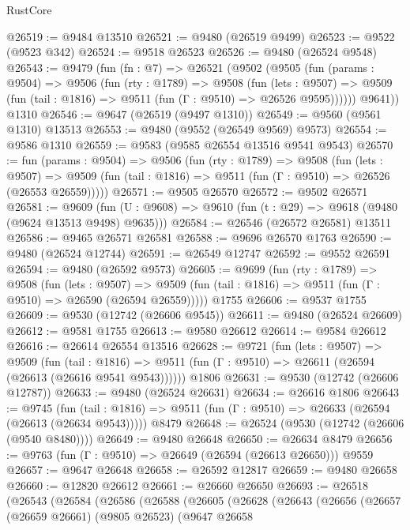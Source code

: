 \begin{lexlean}{RustCore}
\begin{coremodule}
@26519 := @9484 @13510
@26521 := @9480 (@26519 @9499)
@26523 := @9522 (@9523 @342)
@26524 := @9518 @26523
@26526 := @9480 (@26524 @9548)
@26543 := @9479
    (fun (fn : @7) =>
    @26521
      (@9502
        (@9505
          (fun (params : @9504) =>
          @9506
            (fun (rty : @1789) =>
            @9508
              (fun (lets : @9507) =>
              @9509 (fun (tail : @1816) => @9511 (fun (Γ : @9510) => @26526 @9595))))))
        @9641))
    @1310
@26546 := @9647 (@26519 (@9497 @1310))
@26549 := @9560 (@9561 @1310) @13513
@26553 := @9480 (@9552 (@26549 @9569) @9573)
@26554 := @9586 @1310
@26559 := @9583 (@9585 @26554 @13516 @9541 @9543)
@26570 := fun (params : @9504) =>
  @9506
    (fun (rty : @1789) =>
    @9508
      (fun (lets : @9507) =>
      @9509 (fun (tail : @1816) => @9511 (fun (Γ : @9510) => @26526 (@26553 @26559)))))
@26571 := @9505 @26570
@26572 := @9502 @26571
@26581 := @9609
    (fun (U : @9608) => @9610 (fun (t : @29) => @9618 (@9480 (@9624 @13513 @9498) @9635)))
@26584 := @26546 (@26572 @26581) @13511
@26586 := @9465 @26571 @26581
@26588 := @9696 @26570 @1763
@26590 := @9480 (@26524 @12744)
@26591 := @26549 @12747
@26592 := @9552 @26591
@26594 := @9480 (@26592 @9573)
@26605 := @9699
    (fun (rty : @1789) =>
    @9508
      (fun (lets : @9507) =>
      @9509 (fun (tail : @1816) => @9511 (fun (Γ : @9510) => @26590 (@26594 @26559)))))
    @1755
@26606 := @9537 @1755
@26609 := @9530 (@12742 (@26606 @9545))
@26611 := @9480 (@26524 @26609)
@26612 := @9581 @1755
@26613 := @9580 @26612
@26614 := @9584 @26612
@26616 := @26614 @26554 @13516
@26628 := @9721
    (fun (lets : @9507) =>
    @9509
      (fun (tail : @1816) =>
      @9511 (fun (Γ : @9510) => @26611 (@26594 (@26613 (@26616 @9541 @9543))))))
    @1806
@26631 := @9530 (@12742 (@26606 @12787))
@26633 := @9480 (@26524 @26631)
@26634 := @26616 @1806
@26643 := @9745
    (fun (tail : @1816) => @9511 (fun (Γ : @9510) => @26633 (@26594 (@26613 (@26634 @9543)))))
    @8479
@26648 := @26524 (@9530 (@12742 (@26606 (@9540 @8480))))
@26649 := @9480 @26648
@26650 := @26634 @8479
@26656 := @9763 (fun (Γ : @9510) => @26649 (@26594 (@26613 @26650))) @9559
@26657 := @9647 @26648
@26658 := @26592 @12817
@26659 := @9480 @26658
@26660 := @12820 @26612
@26661 := @26660 @26650
@26693 := @26518
    (@26543
      (@26584
        (@26586
          (@26588
            (@26605
              (@26628
                (@26643
                  (@26656
                    (@26657
                      (@26659 @26661)
                      (@9805 @26523)
                      (@9647
                        @26658

\end{coremodule}
\end{lexlean}

